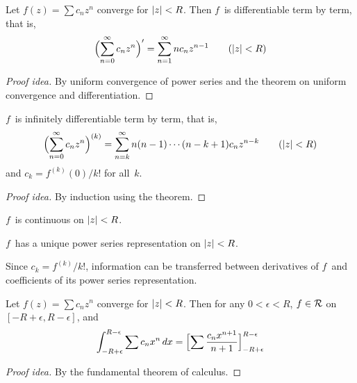 \begin{thm}
Let \(f(z)=\sum c_n z^n\) converge for \(|{z}|<R\). Then \(f\)~is differentiable term by term, that is,
\[\Bigl(\sum_{n=0}^\infty c_n z^n\Bigr)'=\sum_{n=1}^\infty n c_n z^{n-1}\qquad(|{z}|<R)\]
\end{thm}
\begin{proof}[Proof idea]
By uniform convergence of power series and the theorem on uniform convergence and differentiation.
\end{proof}
\begin{cor}
\(f\)~is infinitely differentiable term by term, that is,
\[\Bigl(\sum_{n=0}^\infty c_n z^n\Bigr)^{(k)}=\sum_{n=k}^\infty n(n-1)\cdots(n-k+1) c_n z^{n-k}\qquad(|{z}|<R)\]
and \(c_k=f^{(k)}(0)/k!\) for all~\(k\).
\end{cor}
\begin{proof}[Proof idea]
By induction using the theorem.
\end{proof}
\begin{cor}
\(f\)~is continuous on \(|{z}|<R\).
\end{cor}
\begin{cor}
\(f\)~has a unique power series representation on \(|{z}|<R\).
\end{cor}
\begin{rmk}
Since \(c_k=f^{(k)}/k!\), information can be transferred between derivatives of \(f\)~and coefficients of its power series representation.
\end{rmk}

\begin{thm}
Let \(f(z)=\sum c_n z^n\) converge for \(|{z}|<R\). Then for any \(0<\epsilon<R\), \(f\in\mathcal{R}\) on \([-R+\epsilon,R-\epsilon]\), and
\[\int_{-R+\epsilon}^{R-\epsilon}\sum c_n x^n\,dx=\Bigl[\sum\frac{c_n x^{n+1}}{n+1}\Bigr]_{-R+\epsilon}^{R-\epsilon}\]
\end{thm}
\begin{proof}[Proof idea]
By the fundamental theorem of calculus.
\end{proof}

